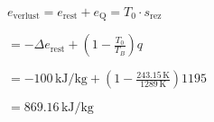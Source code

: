 \( e_{\text{verlust}} = e_{\text{rest}} + e_{\text{Q}} = T_0 \cdot s_{\text{rez}} \)  

\( = - \Delta e_{\text{rest}} + \left( 1 - \frac{T_0}{T_B} \right) q \)  

\( = -100 \, \text{kJ/kg} + \left( 1 - \frac{243.15 \, \text{K}}{1289 \, \text{K}} \right) 1195 \)  

\( = 869.16 \, \text{kJ/kg} \)